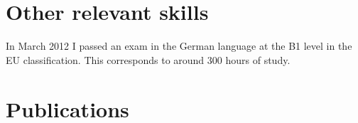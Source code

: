 \documentclass[12pt]{article}
\begin{document}
\section{Other relevant skills}

In March 2012 I passed an exam in the German language
at the B1 level in the EU classification. 
This corresponds to around 300 hours of study.





\section{Publications}









\end{document}
